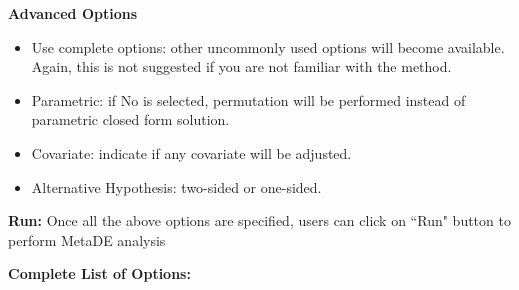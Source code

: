 \begin{steps}
\item \textbf{Advanced Options}
\begin{itemize}
\item Use complete options: other uncommonly used options will become available. Again, this is not suggested if you are not familiar with the method.
\item Parametric: if No is selected, permutation will be performed instead of parametric closed form solution.
\item Covariate: indicate if any covariate will be adjusted.
\item Alternative Hypothesis: two-sided or one-sided.
\end{itemize}

\item \textbf{Run:}
Once all the above options are specified, users can click on ``Run" button to perform MetaDE analysis

\end{steps}
\textbf{Complete List of Options:} 

